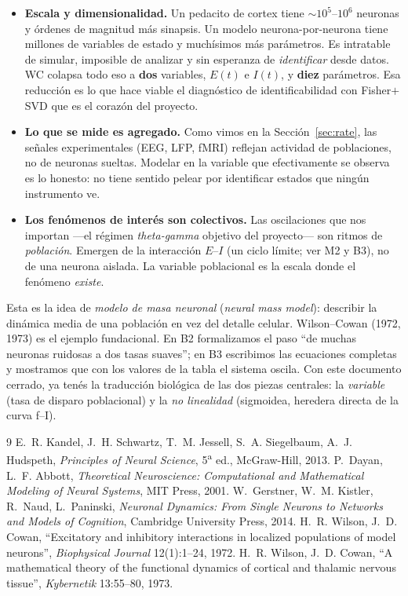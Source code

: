 \documentclass[11pt,a4paper]{article}
\begin{document}
\begin{itemize}
  \item \textbf{Escala y dimensionalidad.} Un pedacito de cortex tiene
  $\sim 10^5$--$10^6$ neuronas y órdenes de magnitud más sinapsis. Un modelo
  neurona-por-neurona tiene millones de variables de estado y muchísimos más
  parámetros. Es intratable de simular, imposible de analizar y sin esperanza
  de \emph{identificar} desde datos. WC colapsa todo eso a \textbf{dos}
  variables, $E(t)$ e $I(t)$, y \textbf{diez} parámetros. Esa reducción es lo
  que hace viable el diagnóstico de identificabilidad con Fisher$+$SVD que es el
  corazón del proyecto.
  \item \textbf{Lo que se mide es agregado.} Como vimos en la
  Sección~\ref{sec:rate}, las señales experimentales (EEG, LFP, fMRI) reflejan
  actividad de poblaciones, no de neuronas sueltas. Modelar en la variable que
  efectivamente se observa es lo honesto: no tiene sentido pelear por
  identificar estados que ningún instrumento ve.
  \item \textbf{Los fenómenos de interés son colectivos.} Las oscilaciones que
  nos importan ---el régimen \emph{theta-gamma} objetivo del proyecto--- son
  ritmos de \emph{población}. Emergen de la interacción $E$--$I$ (un ciclo
  límite; ver M2 y B3), no de una neurona aislada. La variable poblacional es la
  escala donde el fenómeno \emph{existe}.
\end{itemize}

Esta es la idea de \emph{modelo de masa neuronal} (\emph{neural mass model}):
describir la dinámica media de una población en vez del detalle celular.
Wilson--Cowan (1972, 1973) es el ejemplo fundacional. En B2 formalizamos el paso
``de muchas neuronas ruidosas a dos tasas suaves''; en B3 escribimos las
ecuaciones completas y mostramos que con los valores de la tabla el sistema
oscila. Con este documento cerrado, ya tenés la traducción biológica de las dos
piezas centrales: la \emph{variable} (tasa de disparo poblacional) y la
\emph{no linealidad} (sigmoidea, heredera directa de la curva f--I).

\begin{thebibliography}{9}
 E.~R. Kandel, J.~H. Schwartz, T.~M. Jessell, S.~A. Siegelbaum,
A.~J. Hudspeth, \emph{Principles of Neural Science}, 5\textsuperscript{a} ed.,
McGraw-Hill, 2013.
 P.~Dayan, L.~F. Abbott, \emph{Theoretical Neuroscience:
Computational and Mathematical Modeling of Neural Systems}, MIT Press, 2001.
 W.~Gerstner, W.~M. Kistler, R.~Naud, L.~Paninski,
\emph{Neuronal Dynamics: From Single Neurons to Networks and Models of
Cognition}, Cambridge University Press, 2014.
 H.~R. Wilson, J.~D. Cowan, ``Excitatory and inhibitory
interactions in localized populations of model neurons'', \emph{Biophysical
Journal} 12(1):1--24, 1972.
 H.~R. Wilson, J.~D. Cowan, ``A mathematical theory of the
functional dynamics of cortical and thalamic nervous tissue'', \emph{Kybernetik}
13:55--80, 1973.
\end{thebibliography}
\end{document}
